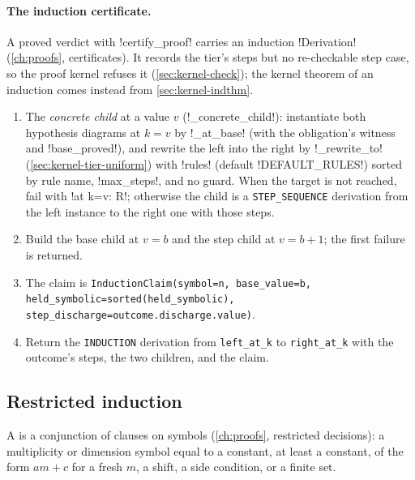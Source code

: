 \paragraph{The induction certificate.} A proved verdict with \code!certify_proof! carries an induction \py!Derivation! (\cref{ch:proofs}, certificates). It records the tier's steps but no re-checkable step case, so the proof kernel refuses it (\cref{sec:kernel-check}); the kernel theorem of an induction comes instead from \cref{sec:kernel-indthm}.

\begin{algorithm}\label{alg:kernel-derivation}
\begin{enumerate}
\item The \emph{concrete child} at a value $v$ (\py!_concrete_child!): instantiate both hypothesis diagrams at $k=v$ by \py!_at_base! (with the obligation's witness and \py!base_proved!), and rewrite the left into the right by \py!_rewrite_to! (\cref{sec:kernel-tier-uniform}) with \code!rules! (default \py!DEFAULT_RULES!) sorted by rule name, \code!max_steps!, and no guard. When the target is not reached, fail with \code!at k=v: R!; otherwise the child is a \texttt{STEP\_SEQUENCE} derivation from the left instance to the right one with those steps.
\item Build the base child at $v=b$ and the step child at $v=b+1$; the first failure is returned.
\item The claim is \texttt{InductionClaim(\allowbreak{}symbol=n,\allowbreak{} base\_\allowbreak{}value=b,\allowbreak{} held\_\allowbreak{}symbolic=sorted(\allowbreak{}held\_\allowbreak{}symbolic),\allowbreak{} step\_\allowbreak{}discharge=outcome.\allowbreak{}discharge.\allowbreak{}value)}.
\item Return the \texttt{INDUCTION} derivation from \texttt{left\_at\_k} to \texttt{right\_at\_k} with the outcome's steps, the two children, and the claim.
\end{enumerate}
\end{algorithm}

\subsection{Restricted induction}\label{sec:kernel-restricted}

A  is a conjunction of clauses on symbols (\cref{ch:proofs}, restricted decisions): a multiplicity or dimension symbol equal to a constant, at least a constant, of the form $a m+c$ for a fresh $m$, a shift, a side condition, or a finite set.


